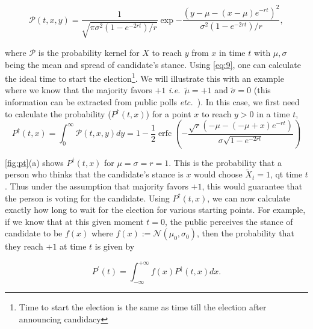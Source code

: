 \documentclass[aps,prl,twocolumn,showpacs,final]{revtex4-1}
\newcommand{\ie}{\textit{i.e.\ }}
\newcommand{\etc}{\textit{etc.\ }}
\newcommand\pN{\mathcal{N}}
\begin{document}
\begin{dmath}
\mathcal{P}(t, x, y)=\frac{1}{\sqrt{\pi \sigma^{2}\left(1-e^{-2 r t}\right) / r}} \exp {-\frac{\left(y-\mu-(x-\mu) e^{-r t}\right)^{2}}{\sigma^{2}\left(1-e^{-2 r t}\right) / r} }\label{eq:9},
\end{dmath}

where $\mathcal{P}$ is the probability kernel for $X$ to reach $y$ from $x$ in time $t$ with $\mu,\sigma$ being the mean and spread of candidate's stance. Using \eqref{eq:9}, one can calculate the ideal time to start the election\footnote{Time to start the election is the same as time till the election after announcing candidacy}. We will illustrate this with an example where we know that the majority favors $+1$ \ie $\tilde{\mu}=+1$ and $\tilde{\sigma}=0$ (this information can be extracted from public polls \etc). In this case, we first need to calculate the probability ($P^\dagger(t,x)$) for a point $x$ to reach $y>0$ in a time $t$, 
\begin{dmath}
	P^\dagger(t,x)=\int_0^\infty \mathcal{P}(t,x,y)dy= 1 - \frac{1}{2}\operatorname{erfc}{\left(- \frac{\sqrt{r} \left(- \mu - \left(- \mu + x\right) e^{- r t}\right)}{\sigma \sqrt{1 - e^{- 2 r t}}} \right)}\label{eq:10}
\end{dmath}

\autoref{fig:pt}(a) shows $P^\dagger(t,x)$ for $\mu=\sigma=r=1$. This is the probability that a person who thinks that the candidate's stance is $x$ would choose $\tilde{X}_t=1$, qt time $t$. Thus under the assumption that majority favors $+1$, this would guarantee that the person is voting for the candidate. Using $P^\dagger(t,x)$, we can now calculate exactly how long to wait for the election for various starting points. For example, if we know that at this given moment $t=0$, the public perceives the stance of candidate to be $f(x)$ where $f(x):=\pN(\mu_{0},\sigma_0)$, then the probability that they reach $+1$ at time $t$ is given by

\begin{dmath}
P^\prime(t)=\int_{-\infty}^{+\infty} f(x) P^\dagger(t,x) dx. \label{eq:11}
\end{dmath}
\end{document}
